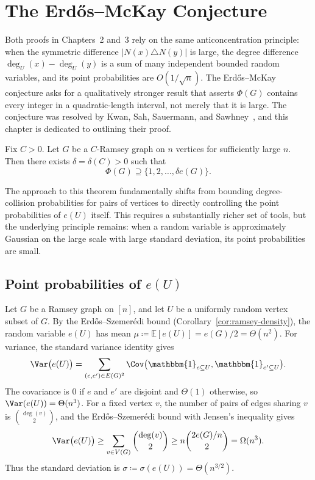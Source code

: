 \section{The Erd\H{o}s--McKay Conjecture}
\label{sec:ch4}

Both proofs in Chapters~2 and~3 rely on the same anticoncentration principle: when the symmetric difference $|N(x) \triangle N(y)|$ is large, the degree difference $\deg_U(x) - \deg_U(y)$ is a sum of many independent bounded random variables, and its point probabilities are $O(1/\sqrt{n})$. The Erd\H{o}s--McKay conjecture asks for a qualitatively stronger result that asserts $\Phi(G)$ contains every integer in a quadratic-length interval, not merely that it is large. The conjecture was resolved by Kwan, Sah, Sauermann, and Sawhney~\cite{Kwan_2023}, and this chapter is dedicated to outlining their proof. 
\begin{theorem}
  \label{thm:em}
  Fix $C > 0$. Let $G$ be a $C$-Ramsey graph on $n$ vertices for sufficiently large $n$. Then there exists $\delta = \delta(C) > 0$ such that
  \[
    \Phi(G) \supseteq \bigl\{1, 2, \ldots, \delta e(G)\bigr\}.
  \]
\end{theorem}

The approach to this theorem fundamentally shifts from bounding degree-collision probabilities for pairs of vertices to directly controlling the point probabilities of $e(U)$ itself. This requires a substantially richer set of tools, but the underlying principle remains: when a random variable is approximately Gaussian on the large scale with large standard deviation, its point probabilities are small.

\subsection{Point probabilities of $e(U)$}

Let $G$ be a Ramsey graph on $[n]$, and let $U$ be a uniformly random vertex subset of $G$. By the Erd\H{o}s--Szemer\'{e}di bound (Corollary~\ref{cor:ramsey-density}), the random variable $e(U)$ has mean $\mu \coloneqq \mathbb{E}[e(U)] = e(G)/2 = \Theta(n^2)$. For variance, the standard variance identity gives
\[
  \Var\bigl(e(U)\bigr) = \sum_{(e, e') \in E(G)^2} \Cov\bigl(\mathbbm{1}_{e \subseteq U}, \mathbbm{1}_{e' \subseteq U}\bigr).
\]
The covariance is $0$ if $e$ and $e'$ are disjoint and $\Theta(1)$ otherwise, so $\Var(e(U)) = \Theta(n^3)$. For a fixed vertex $v$, the number of pairs of edges sharing $v$ is $\binom{\deg(v)}{2}$, and the Erd\H{o}s--Szemer\'{e}di bound with Jensen's inequality gives
\[
  \Var\bigl(e(U)\bigr) \geq \sum_{v \in V(G)} \binom{\deg(v)}{2} \geq n\binom{2e(G)/n}{2} = \Omega(n^3).
\]
Thus the standard deviation is $\sigma \coloneqq \sigma(e(U)) = \Theta(n^{3/2})$. 

